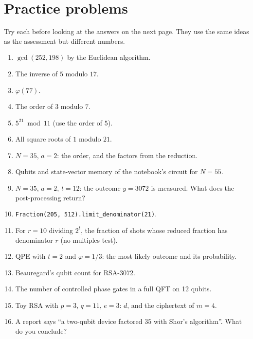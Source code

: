 \documentclass[11pt,a4paper,openany]{book}
\begin{document}
\section{Practice problems}
Try each before looking at the answers on the next page. They use the same ideas as the assessment but different numbers.
\begin{enumerate}[label=\textbf{P\arabic*.}, leftmargin=2.6em, itemsep=3pt]
\item $\gcd(252, 198)$ by the Euclidean algorithm.
\item The inverse of $5$ modulo $17$.
\item $\varphi(77)$.
\item The order of $3$ modulo $7$.
\item $5^{21} \bmod 11$ (use the order of $5$).
\item All square roots of $1$ modulo $21$.
\item $N = 35$, $a = 2$: the order, and the factors from the reduction.
\item Qubits and state-vector memory of the notebook's circuit for $N = 55$.
\item $N = 35$, $a = 2$, $t = 12$: the outcome $y = 3072$ is measured. What does the post-processing return?
\item \texttt{Fraction(205, 512).limit\_denominator(21)}.
\item For $r = 10$ dividing $2^t$, the fraction of shots whose reduced fraction has denominator $r$ (no multiples test).
\item QPE with $t = 2$ and $\varphi = 1/3$: the most likely outcome and its probability.
\item Beauregard's qubit count for RSA-3072.
\item The number of controlled phase gates in a full QFT on 12 qubits.
\item Toy RSA with $p = 3$, $q = 11$, $e = 3$: $d$, and the ciphertext of $m = 4$.
\item A report says ``a two-qubit device factored $35$ with Shor's algorithm''. What do you conclude?
\end{enumerate}

\newpage
\end{document}
